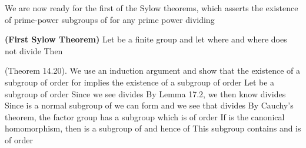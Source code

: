 \documentclass[11pt,oneside]{article}
\begin{document}
\begin{BookBody}

\noindent We are now ready for the first of the Sylow theorems, which asserts the existence of prime-power subgroups of  for any prime power dividing 

 \textbf{(First Sylow Theorem)} Let  be a finite group and let  where  and where  does not divide  Then



 (Theorem 14.20). We use an induction argument and show that the existence of a subgroup of order  for  implies the existence of a subgroup of order  Let  be a subgroup of order  Since  we see  divides  By Lemma 17.2, we then know  divides  Since  is a normal subgroup of  we can form  and we see that  divides  By Cauchy’s theorem, the factor group  has a subgroup  which is of order  If  is the canonical homomorphism, then  is a subgroup of  and hence of  This subgroup contains  and is of order 




\end{BookBody}
\end{document}
